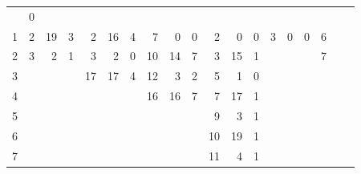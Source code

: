 \begin{esempio}
\begin{figure}[H]
{\begin{tabular}{r|rrr|rrr|rrr|rrr|rrr|rrr}
                                                       &  0 & \\
        1 &  2 & 19 &  3 &  \textcolor{nordcyan}{2} & \textcolor{nordcyan}{16} &  \textcolor{nordcyan}{4}
          &  7 &  0 &  0 &  2 &  0 &  0 &  3 &  0 &  0 &  6 & \\
        2 &  \textcolor{nordred}{3} &  \textcolor{nordred}{2} &  \textcolor{nordred}{1}
                                                                                                                       &  \textcolor{nordred}{3} &  \textcolor{nordred}{2} &  \textcolor{nordred}{0}
          & 10 & 14 &  7 &  \textcolor{nordcyan}{3} & \textcolor{nordcyan}{15} &  \textcolor{nordcyan}{1}
                                        &    &    &    &  \textcolor{nordred}{7} & \\
        3 &    &    &    & 17 & 17 &  4 & \textcolor{nordred}{12} &  \textcolor{nordred}{3} &  \textcolor{nordred}{2}
                         &  \textcolor{nordred}{5} &  \textcolor{nordred}{1} &  \textcolor{nordred}{0} &    &    &    &    & \\
        4 &    &    &    &    &    &    & 16 & 16 &  7 &  7 & 17 &  1 &    &    &    &    & \\
        5 &    &    &    &    &    &    &    &    &    &  9 &  3 &  1 &    &    &    &    & \\
        6 &    &    &    &    &    &    &    &    &    & 10 & 19 &  1 &    &    &    &    & \\
        7 &    &    &    &    &    &    &    &    &    & 11 &  4 &  1 &    &    &    &    &
      \end{tabular}
    }


\end{figure}
\end{esempio}
